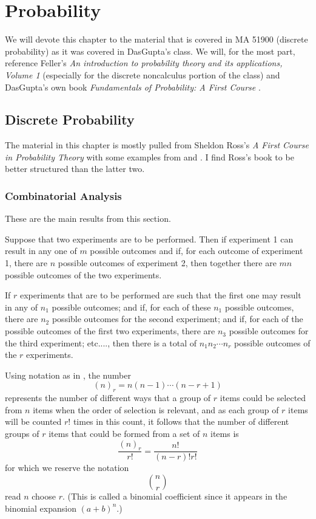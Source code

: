 \chapter{Probability}
We will devote this chapter to the material that is covered in MA 51900
(discrete probability) as it was covered in DasGupta's class. We will, for
the most part, reference Feller's \emph{An introduction to probability
  theory and its applications, Volume 1} \cite{feller} (especially for the
discrete noncalculus portion of the class) and DasGupta's own book
\emph{Fundamentals of Probability: A First Course} \cite{dasgupta}.

\section{Discrete Probability}
The material in this chapter is mostly pulled from Sheldon Ross's \emph{A
  First Course in Probability Theory} with some examples from
\cite{dasgupta} and \cite{feller}. I find Ross's book to be better
structured than the latter two.

\subsection{Combinatorial Analysis}
These are the main results from this section.
\begin{theorem}
  Suppose that two experiments are to be performed. Then if experiment 1
  can result in any one of \(m\) possible outcomes and if, for each outcome
  of experiment 1, there are \(n\) possible outcomes of experiment 2, then
  together there are \(mn\) possible outcomes of the two experiments.
\end{theorem}
\begin{theorem}
  If \(r\) experiments that are to be performed are such that the first one
  may result in any of \(n_1\) possible outcomes; and if, for each of these
  \(n_1\) possible outcomes, there are \(n_2\) possible outcomes for the
  second experiment; and if, for each of the possible outcomes of the first
  two experiments, there are \(n_3\) possible outcomes for the third
  experiment; etc.\@ ..., then there is a total of \(n_1n_2\dotsm n_r\)
  possible outcomes of the \(r\) experiments.
\end{theorem}

Using notation as in \cite{feller}, the number
\[
  (n)_r=n(n-1)\dotsm(n-r+1)
\]
represents the number of different ways that a group of \(r\) items could
be selected from \(n\) items when the order of selection is relevant, and
as each group of \(r\) items will be counted \(r!\) times in this count, it
follows that the number of different groups of \(r\) items that could be
formed from a set of \(n\) items is
\[
  \frac{(n)_r}{r!}=\frac{n!}{(n-r)!r!}
\]
for which we reserve the notation
\[
  \binom{n}{r}
\]
read \(n\) choose \(r\). (This is called a binomial coefficient since it
appears in the binomial expansion \((a+b)^n\).)

